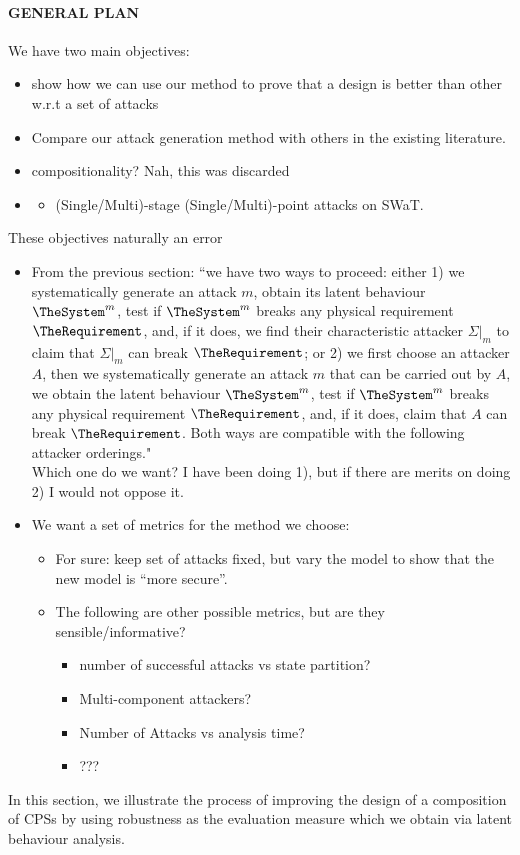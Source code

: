 {{\paragraph{GENERAL PLAN}
We have two main objectives:
\begin{itemize}
  \item show how we can use our method to prove that a design is better than other w.r.t a set of attacks
  \item Compare our attack generation method with others in the existing literature. 
  \item compositionality? Nah, this was discarded
  \item 
  \begin{itemize}
    \item (Single/Multi)-stage (Single/Multi)-point attacks on SWaT.
  \end{itemize}
\end{itemize}
These objectives naturally an error 
\begin{itemize}
  \item From the previous section: ``we have two ways to proceed: either 1) we systematically generate an attack $m$, obtain its latent behaviour $\TheSystem^m$, test if $\TheSystem^m$ breaks any physical requirement $\TheRequirement$, and, if it does, we find their characteristic attacker $\Sigma|_m$ to claim that $\Sigma|_m$ can break $\TheRequirement$; or 2) we first choose an attacker $A$, then we systematically generate an attack $m$ that can be carried out by $A$, we obtain the latent behaviour $\TheSystem^m$, test if $\TheSystem^m$ breaks any physical requirement $\TheRequirement$, and, if it does, claim that $A$ can break $\TheRequirement$. Both ways are compatible with the following attacker orderings."\\
  Which one do we want? I have been doing 1), but if there are merits on doing 2) I would not oppose it.  
  \item We want a set of metrics for the method we choose:
  \begin{itemize}
    \item For sure: keep set of attacks fixed, but vary the model to show that the new model is ``more secure''.
    \item The following are other possible metrics, but are they sensible/informative?
    \begin{itemize}
      \item number of successful attacks vs state partition?
      \item Multi-component attackers? 
      \item Number of Attacks vs analysis time?
      \item ???
    \end{itemize}
  \end{itemize}
\end{itemize}
}
In this section, we illustrate the process of improving the design of a composition of CPSs by using robustness as the evaluation measure which we obtain via latent behaviour analysis.
}
